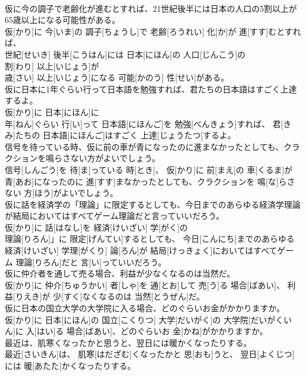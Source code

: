 \documentclass[8pt]{extreport}
\begin{document}
\begin{CJK}{UTF8}{min}
\\	仮に今の調子で老齢化が進むとすれば、21世紀後半には日本の人口の5割以上が65歳以上になる可能性がある。	
\\	仮[かり]に 今[いま]の 調子[ちょうし]で 老齢[ろうれい] 化[か]が 進[すす]むとすれば、 
\\	世紀[せいき] 後半[こうはん]には 日本[にほん]の 人口[じんこう]の 
\\	割[わり] 以上[いじょう]が 
\\	歳[さい] 以上[いじょう]になる 可能[かのう] 性[せい]がある。
\\	仮に日本に1年ぐらい行って日本語を勉強すれば、君たちの日本語はすごく上達するよ。	
\\	仮[かり]に 日本[にほん]に 
\\	年[ねん]ぐらい 行[い]って 日本語[にほんご]を 勉強[べんきょう]すれば、 君[きみ]たちの 日本語[にほんご]はすごく 上達[じょうたつ]するよ。
\\	信号を待っている時、仮に前の車が青になったのに進まなかったとしても、クラクションを鳴らさない方がよいでしょう。	
\\	信号[しんごう]を 待[ま]っている 時[とき]、 仮[かり]に 前[まえ]の 車[くるま]が 青[あお]になったのに 進[すす]まなかったとしても、クラクションを 鳴[な]らさない 方[ほう]がよいでしょう。
\\	仮に話を経済学の「理論」に限定するとしても、今日までのあらゆる経済学理論が結局においてはすべてゲーム理論だと言っていいだろう。	
\\	仮[かり]に 話[はなし]を 経済[けいざい] 学[がく]の
\\	理論[りろん]」に 限定[げんてい]するとしても、 今日[こんにち]までのあらゆる 経済[けいざい] 学理[がくり] 論[ろん]が 結局[けっきょく]においてはすべてゲーム 理論[りろん]だと 言[い]っていいだろう。
\\	仮に仲介者を通して売る場合、利益が少なくなるのは当然だ。	
\\	仮[かり]に 仲介[ちゅうかい] 者[しゃ]を 通[とお]して 売[う]る 場合[ばあい]、 利益[りえき]が 少[すく]なくなるのは 当然[とうぜん]だ。
\\	仮に日本の国立大学の大学院に入る場合、どのぐらいお金がかかりますか。	
\\	仮[かり]に 日本[にほん]の 国立[こくりつ] 大学[だいがく]の 大学院[だいがくいん]に 入[はい]る 場合[ばあい]、どのぐらいお 金[かね]がかかりますか。
\\	最近は、肌寒くなったかと思うと、翌日には暖かくなったりする。	
\\	最近[さいきん]は、 肌寒[はだざむ]くなったかと 思[おも]うと、 翌日[よくじつ]には 暖[あたた]かくなったりする。

\end{CJK}
\end{document}
